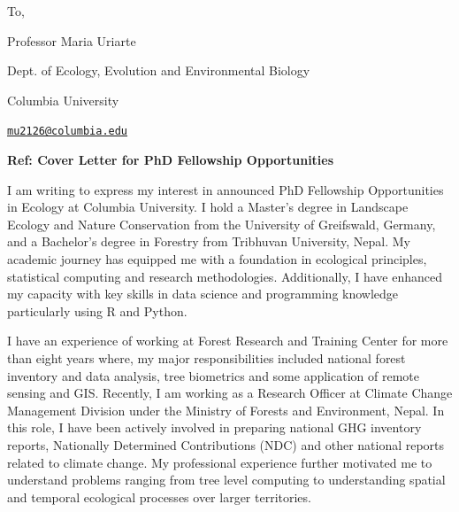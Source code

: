 \documentclass[
]{article}
\author{}
\date{\vspace{-2.5em}}
\begin{document}

To,

Professor Maria Uriarte

Dept. of Ecology, Evolution and Environmental Biology

Columbia University

\href{mailto:mu2126@columbia.edu}{\nolinkurl{mu2126@columbia.edu}}

\begin{centering}

\bf{Ref: Cover Letter for PhD Fellowship Opportunities}

\end{centering}

I am writing to express my interest in announced PhD Fellowship
Opportunities in Ecology at Columbia University. I hold a Master's
degree in Landscape Ecology and Nature Conservation from the University
of Greifswald, Germany, and a Bachelor's degree in Forestry from
Tribhuvan University, Nepal. My academic journey has equipped me with a
foundation in ecological principles, statistical computing and research
methodologies. Additionally, I have enhanced my capacity with key skills
in data science and programming knowledge particularly using R and
Python.

I have an experience of working at Forest Research and Training Center
for more than eight years where, my major responsibilities included
national forest inventory and data analysis, tree biometrics and some
application of remote sensing and GIS. Recently, I am working as a
Research Officer at Climate Change Management Division under the
Ministry of Forests and Environment, Nepal. In this role, I have been
actively involved in preparing national GHG inventory reports,
Nationally Determined Contributions (NDC) and other national reports
related to climate change. My professional experience further motivated
me to understand problems ranging from tree level computing to
understanding spatial and temporal ecological processes over larger
territories.
\end{document}
